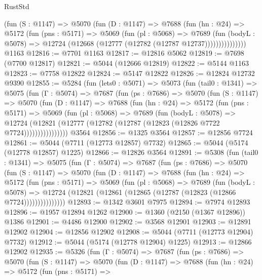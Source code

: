 \begin{lexlean}{RustStd}
\begin{coremodule}
              (fun (S : @1147) =>
              @5070
                (fun (D : @1147) =>
                @7688
                  (fun (hn : @24) =>
                  @5172
                    (fun (pns : @5171) =>
                    @5069
                      (fun (pl : @5068) =>
                      @7689
                        (fun (bodyL : @5078) =>
                        @12724 (@12668 (@12777 (@12782 (@12787 @12737)))))))))))))))
    @1163
@12816 := @7701 @1163
@12817 := @12816 @5062
@12819 := @7698 (@7700 @12817)
@12821 := @5044 (@12666 @12819)
@12822 := @5144 @1163
@12823 := @7758 @12822
@12824 := @5147 @12822
@12826 := @12824 @12732 @9390
@12855 := @5284
    (fun (lets0 : @5071) =>
    @5073
      (fun (tail0 : @1341) =>
      @5075
        (fun (Γ : @5074) =>
        @7687
          (fun (ps : @7686) =>
          @5070
            (fun (S : @1147) =>
            @5070
              (fun (D : @1147) =>
              @7688
                (fun (hn : @24) =>
                @5172
                  (fun (pns : @5171) =>
                  @5069
                    (fun (pl : @5068) =>
                    @7689
                      (fun (bodyL : @5078) =>
                      @12724
                        (@12821 (@12777 (@12782 (@12787 (@12823 (@12826 @7722 @7724))))))))))))))))
    @3564
@12856 := @1325 @3564
@12857 := @12856 @7724
@12861 := @5044 (@7711 (@12773 @12857) @7732)
@12865 := @5044 (@5174 (@12778 @12857) @1225)
@12866 := @12826 @3564
@12891 := @5308
    (fun (tail0 : @1341) =>
    @5075
      (fun (Γ : @5074) =>
      @7687
        (fun (ps : @7686) =>
        @5070
          (fun (S : @1147) =>
          @5070
            (fun (D : @1147) =>
            @7688
              (fun (hn : @24) =>
              @5172
                (fun (pns : @5171) =>
                @5069
                  (fun (pl : @5068) =>
                  @7689
                    (fun (bodyL : @5078) =>
                    @12724 (@12821 (@12861 (@12865 (@12787 (@12823 (@12866 @7724)))))))))))))))
@12893 := @1342 @3601 @7975
@12894 := @7974 @12893
@12896 := @1957 @12894 @1262
@12900 := @1360 (@2150 (@1367 @12896)) @1386
@12901 := @4486 @12900
@12902 := @3568 @12901
@12903 := @12891 @12902
@12904 := @12856 @12902
@12908 := @5044 (@7711 (@12773 @12904) @7732)
@12912 := @5044 (@5174 (@12778 @12904) @1225)
@12913 := @12866 @12902
@12935 := @5326
    (fun (Γ : @5074) =>
    @7687
      (fun (ps : @7686) =>
      @5070
        (fun (S : @1147) =>
        @5070
          (fun (D : @1147) =>
          @7688
            (fun (hn : @24) =>
            @5172
              (fun (pns : @5171) =>

\end{coremodule}
\end{lexlean}
